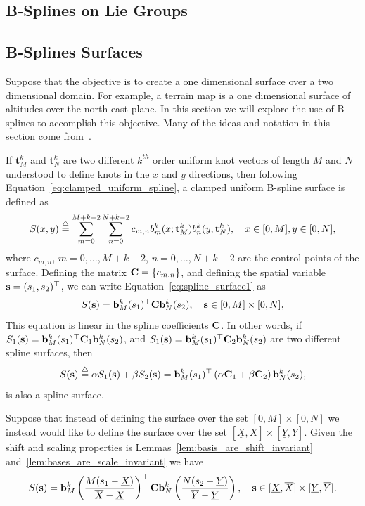 \subsection{B-Splines on Lie Groups}

\subsection{B-Splines Surfaces}

Suppose that the objective is to create a one dimensional surface over a two dimensional domain.  For example, a terrain map is a one dimensional surface of altitudes over the north-east plane.  In this section we will explore the use of B-splines to accomplish this objective. Many of the ideas and notation in this section come from~\cite{RodriguesTsiogkasAguiar20}.

If $\mathbf{t}_M^k$ and $\mathbf{t}_N^k$ are two different $k^{th}$ order uniform knot vectors of length $M$ and $N$ understood to define knots in the $x$ and $y$ directions, then following Equation~\eqref{eq:clamped_uniform_spline}, a clamped uniform B-spline surface is defined as 
\begin{equation}\label{eq:spline_surface1}
S(x, y) \defeq \sum_{m=0}^{M+k-2} \sum_{n=0}^{N+k-2} c_{m,n} b^k_m(x; \mathbf{t}_M^k) b^k_n(y; \mathbf{t}_N^k), \quad x\in[0,M], y\in[0, N],
\end{equation}
where $c_{m, n}$, $m=0, \dots, M+k-2$, $n=0, \dots, N+k-2$ are the control points of the surface.  Defining the matrix $\mathbf{C}=\{c_{m,n}\}$, and defining the spatial variable $\mathbf{s} = (s_1, s_2)^\top$, we can write Equation~\eqref{eq:spline_surface1} as
\begin{equation}\label{eq:spline_surface2}
S(\sbf) = \bbf^k_M(s_1)^\top \Cbf \bbf^k_N(s_2), \quad \sbf\in[0, M]\times[0, N],
\end{equation}
This equation is linear in the spline coefficients $\mathbf{C}$.  In other words, if $S_1(\mathbf{s})=\mathbf{b}^k_M(s_1)^\top \mathbf{C}_1 \mathbf{b}^k_N(s_2)$, and $S_1(\mathbf{s})=\mathbf{b}^k_M(s_1)^\top \mathbf{C}_2 \mathbf{b}^k_N(s_2)$ are two different spline surfaces, then 
\[
S(\mathbf{s})\stackrel{\triangle}{=} \alpha S_1(\mathbf{s}) + \beta S_2(\mathbf{s}) = \mathbf{b}^k_M(s_1)^\top \left(\alpha\mathbf{C}_1 + \beta\mathbf{C}_2\right) \mathbf{b}^k_N(s_2),
\]
is also a spline surface.

Suppose that instead of defining the surface over the set $[0, M]\times[0, N]$ we instead would like to define the surface over the set $[\underline{X}, \overline{X}]\times[\underline{Y}, \overline{Y}]$.  Given the shift and scaling properties is Lemmas~\ref{lem:basis_are_shift_invariant} and~\ref{lem:bases_are_scale_invariant} we have 
\begin{equation}\label{eq:spline_surface3}
S(\sbf) = \bbf^k_M\left(\frac{M(s_1-\underline{X})}{\overline{X}-\underline{X}}\right)^\top \Cbf \bbf^k_N\left(\frac{N(s_2-\underline{Y})}{\overline{Y}-\underline{Y}}\right), \quad \sbf\in[\underline{X}, \overline{X}]\times[\underline{Y}, \overline{Y}].
\end{equation}

